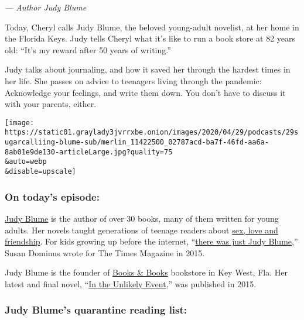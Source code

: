 \emph{--- Author Judy Blume}

Today, Cheryl calls Judy Blume, the beloved young-adult novelist, at her
home in the Florida Keys. Judy tells Cheryl what it's like to run a book
store at 82 years old: ``It's my reward after 50 years of writing.''

Judy talks about journaling, and how it saved her through the hardest
times in her life. She passes on advice to teenagers living through the
pandemic: Acknowledge your feelings, and write them down. You don't have
to discuss it with your parents, either.

\texttt{[image: https://static01.graylady3jvrrxbe.onion/images/2020/04/29/podcasts/29sugarcalliing-blume-sub/merlin\_11422500\_02787acd-ba7f-46fd-aa6a-8ab01e9de130-articleLarge.jpg?quality=75\\\&auto=webp\\\&disable=upscale]}

\hypertarget{on-todays-episode}{%
\subsubsection{\texorpdfstring{\textbf{On today's
episode:}}{On today's episode:}}\label{on-todays-episode}}

\href{http://www.judyblume.com/}{Judy Blume} is the author of over 30
books, many of them written for young adults. Her novels taught
generations of teenage readers about
\href{https://www.nytimes3xbfgragh.onion/2015/06/02/books/what-judy-blumes-books-meant.html}{sex,
love and friendship}. For kids growing up before the internet,
``\href{https://www.nytimes3xbfgragh.onion/2015/05/24/magazine/judy-blume-knows-all-your-secrets.html}{there
was just Judy Blume},'' Susan Dominus wrote for The Times Magazine in
2015.

Judy Blume is the founder of \href{http://booksandbookskw.com/}{Books \&
Books} bookstore in Key West, Fla. Her latest and final novel,
``\href{https://www.nytimes3xbfgragh.onion/2015/05/31/books/review/judy-blumes-in-the-unlikely-event.html}{In
the Unlikely Event},'' was published in 2015.

\hypertarget{judy-blumes-quarantine-reading-list}{%
\subsubsection{\texorpdfstring{\textbf{Judy Blume's quarantine reading
list:}}{Judy Blume's quarantine reading list:}}\label{judy-blumes-quarantine-reading-list}}

